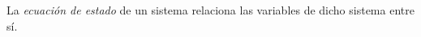 La \textit{ecuación de estado} de un sistema relaciona las variables de dicho sistema entre sí.



































